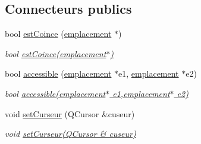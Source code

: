 \subsection*{Connecteurs publics}
\begin{DoxyCompactItemize}
\item 
bool \hyperlink{class_main_window_a4ae4ac96dbfdcb80facbf7da0ae3fb5e}{est\-Coince} (\hyperlink{classemplacement}{emplacement} $\ast$)
\begin{DoxyCompactList}\small\item\em bool \hyperlink{class_main_window_a4ae4ac96dbfdcb80facbf7da0ae3fb5e}{est\-Coince(emplacement$\ast$)} \end{DoxyCompactList}\item 
bool \hyperlink{class_main_window_ac3a2c00ad936408dce78d15697eeef24}{accessible} (\hyperlink{classemplacement}{emplacement} $\ast$e1, \hyperlink{classemplacement}{emplacement} $\ast$e2)
\begin{DoxyCompactList}\small\item\em bool \hyperlink{class_main_window_ac3a2c00ad936408dce78d15697eeef24}{accessible(emplacement$\ast$ e1,emplacement$\ast$ e2)} \end{DoxyCompactList}\item 
void \hyperlink{class_main_window_a8e9fb499b85eef1d31b4caedcdad3424}{set\-Curseur} (Q\-Cursor \&cuseur)
\begin{DoxyCompactList}\small\item\em void \hyperlink{class_main_window_a8e9fb499b85eef1d31b4caedcdad3424}{set\-Curseur(\-Q\-Cursor \& cuseur)} \end{DoxyCompactList}\end{DoxyCompactItemize}
